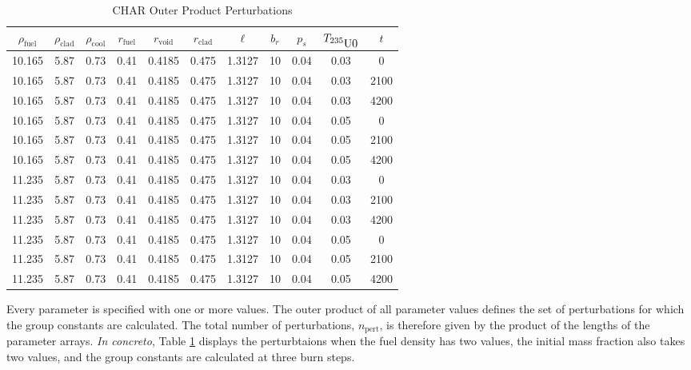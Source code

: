 \begin{table}[htbp]
\begin{center}
\caption{CHAR Outer Product Perturbations}
\label{char_param_outer_product}
\begin{tabular}{|ccccccccccc|}
\hline
\textbf{$\rho_{\mbox{fuel}}$} & \textbf{$\rho_{\mbox{clad}}$} & \textbf{$\rho_{\mbox{cool}}$} & \textbf{$r_{\mbox{fuel}}$} & \textbf{$r_{\mbox{void}}$} & \textbf{$r_{\mbox{clad}}$} & \textbf{$\ell$} & \textbf{$b_r$} & \textbf{$p_s$} & \textbf{$T_{\mbox{\nuc{U}{235}0}}$} & \textbf{$t$} \\
\hline
10.165 & 5.87 & 0.73 & 0.41 & 0.4185 & 0.475 & 1.3127 & 10 & 0.04 & 0.03 & 0    \\ 
10.165 & 5.87 & 0.73 & 0.41 & 0.4185 & 0.475 & 1.3127 & 10 & 0.04 & 0.03 & 2100 \\ 
10.165 & 5.87 & 0.73 & 0.41 & 0.4185 & 0.475 & 1.3127 & 10 & 0.04 & 0.03 & 4200 \\ 
10.165 & 5.87 & 0.73 & 0.41 & 0.4185 & 0.475 & 1.3127 & 10 & 0.04 & 0.05 & 0    \\ 
10.165 & 5.87 & 0.73 & 0.41 & 0.4185 & 0.475 & 1.3127 & 10 & 0.04 & 0.05 & 2100 \\ 
10.165 & 5.87 & 0.73 & 0.41 & 0.4185 & 0.475 & 1.3127 & 10 & 0.04 & 0.05 & 4200 \\ 
11.235 & 5.87 & 0.73 & 0.41 & 0.4185 & 0.475 & 1.3127 & 10 & 0.04 & 0.03 & 0    \\ 
11.235 & 5.87 & 0.73 & 0.41 & 0.4185 & 0.475 & 1.3127 & 10 & 0.04 & 0.03 & 2100 \\ 
11.235 & 5.87 & 0.73 & 0.41 & 0.4185 & 0.475 & 1.3127 & 10 & 0.04 & 0.03 & 4200 \\ 
11.235 & 5.87 & 0.73 & 0.41 & 0.4185 & 0.475 & 1.3127 & 10 & 0.04 & 0.05 & 0    \\ 
11.235 & 5.87 & 0.73 & 0.41 & 0.4185 & 0.475 & 1.3127 & 10 & 0.04 & 0.05 & 2100 \\ 
11.235 & 5.87 & 0.73 & 0.41 & 0.4185 & 0.475 & 1.3127 & 10 & 0.04 & 0.05 & 4200 \\ 
\hline
\end{tabular}
\end{center}
\end{table}

Every parameter is specified with one or more values.  The outer product of all parameter
values defines the set of perturbations for which the group constants are calculated.
The total number of perturbations, $n_{\mbox{pert}}$, is therefore given by the product of 
the lengths of the parameter arrays.  \emph{In concreto}, Table \ref{char_param_outer_product} 
displays the perturbtaions when the fuel density has two values, the initial  mass 
fraction also takes two values, and the group constants are calculated at three burn steps.

